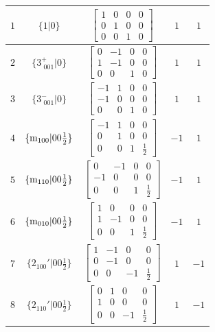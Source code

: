 \documentclass[fleqn,8pt]{jsarticle}
\begin{document}
\begin{longtable}{ccccc}
$ 1 $ & $ \{1|0\} $ & $ \begin{bmatrix} 1 & 0 & 0 & 0 \\ 0 & 1 & 0 & 0 \\ 0 & 0 & 1 & 0 \end{bmatrix} $ & $ 1 $ & $ 1 $ \\ \hline
$ 2 $ & $ \{3^{+}_{\,\,001}|0\} $ & $ \begin{bmatrix} 0 & -1 & 0 & 0 \\ 1 & -1 & 0 & 0 \\ 0 & 0 & 1 & 0 \end{bmatrix} $ & $ 1 $ & $ 1 $ \\ \hline
$ 3 $ & $ \{3^{-}_{\,\,001}|0\} $ & $ \begin{bmatrix} -1 & 1 & 0 & 0 \\ -1 & 0 & 0 & 0 \\ 0 & 0 & 1 & 0 \end{bmatrix} $ & $ 1 $ & $ 1 $ \\ \hline
$ 4 $ & $ \{{\rm m}_{100}|0 0 \frac{1}{2}\} $ & $ \begin{bmatrix} -1 & 1 & 0 & 0 \\ 0 & 1 & 0 & 0 \\ 0 & 0 & 1 & \frac{1}{2} \end{bmatrix} $ & $ -1 $ & $ 1 $ \\ \hline
$ 5 $ & $ \{{\rm m}_{110}|0 0 \frac{1}{2}\} $ & $ \begin{bmatrix} 0 & -1 & 0 & 0 \\ -1 & 0 & 0 & 0 \\ 0 & 0 & 1 & \frac{1}{2} \end{bmatrix} $ & $ -1 $ & $ 1 $ \\ \hline
$ 6 $ & $ \{{\rm m}_{010}|0 0 \frac{1}{2}\} $ & $ \begin{bmatrix} 1 & 0 & 0 & 0 \\ 1 & -1 & 0 & 0 \\ 0 & 0 & 1 & \frac{1}{2} \end{bmatrix} $ & $ -1 $ & $ 1 $ \\ \hline
$ 7 $ & $ \{2{}_{100}{}'|0 0 \frac{1}{2}\} $ & $ \begin{bmatrix} 1 & -1 & 0 & 0 \\ 0 & -1 & 0 & 0 \\ 0 & 0 & -1 & \frac{1}{2} \end{bmatrix} $ & $ 1 $ & $ -1 $ \\ \hline
$ 8 $ & $ \{2{}_{110}{}'|0 0 \frac{1}{2}\} $ & $ \begin{bmatrix} 0 & 1 & 0 & 0 \\ 1 & 0 & 0 & 0 \\ 0 & 0 & -1 & \frac{1}{2} \end{bmatrix} $ & $ 1 $ & $ -1 $ \\ \hline

\end{longtable}
\end{document}
